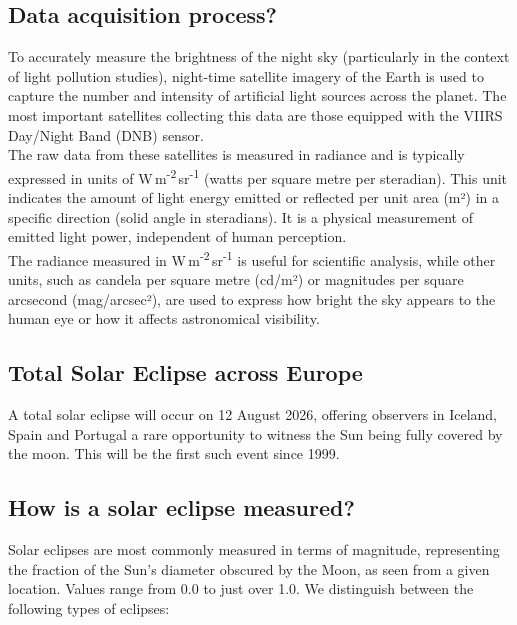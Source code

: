 \documentclass{article}
\begin{document}
\subsection*{Data acquisition process?}

To accurately measure the brightness of the night sky (particularly in the context of light pollution studies), night-time satellite imagery of the Earth is used to capture the number and intensity of artificial light sources across the planet. The most important satellites collecting this data are those equipped with the VIIRS Day/Night Band (DNB) sensor\cite{wiki_light_pollution}\cite{eog_vnl_annual_v2}.\\
The raw data from these satellites is measured in radiance and is typically expressed in units of W\,m\textsuperscript{-2}\,sr\textsuperscript{-1} (watts per square metre per steradian). This unit indicates the amount of light energy emitted or reflected per unit area (m²) in a specific direction (solid angle in steradians). It is a physical measurement of emitted light power, independent of human perception\cite{wiki_light_pollution}\cite{wikipedia_radiance}.\\
The radiance measured in W\,m\textsuperscript{-2}\,sr\textsuperscript{-1} is useful for scientific analysis, while other units, such as candela per square metre (cd/m²) or magnitudes per square arcsecond (mag/arcsec²), are used to express how bright the sky appears to the human eye or how it affects astronomical visibility\cite{wiki_light_pollution}\cite{wikipedia_radiance}.

\subsection*{Total Solar Eclipse across Europe}

A total solar eclipse will occur on 12 August 2026, offering observers in Iceland, Spain and Portugal a rare opportunity to witness the Sun being fully covered by the moon. This will be the first such event since 1999\cite{wiki_2026_aug12_eclipse}\cite{timeanddate_2026_aug12_eclipse}.

\subsection*{How is a solar eclipse measured?}
Solar eclipses are most commonly measured in terms of magnitude, representing the fraction of the Sun's diameter obscured by the Moon, as seen from a given location. Values range from 0.0 to just over 1.0. We distinguish between the following types of eclipses\cite{timeanddate_eclipse_magnitude}:
\end{document}
